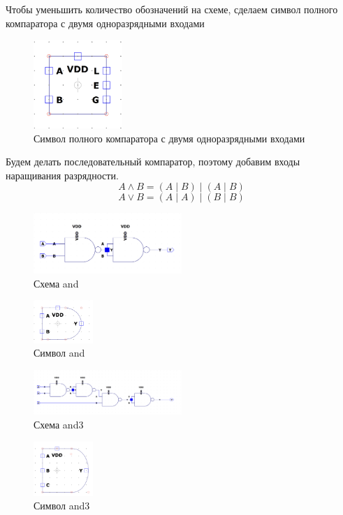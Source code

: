 \documentclass[12pt,onecolumn]{article}
\begin{document}
Чтобы уменьшить количество обозначений на схеме, сделаем символ полного компаратора с двумя одноразрядными входами
\begin{figure}[H]
    \centering
    \includegraphics[width=0.3\textwidth]{image/full-comparator1-sym.png}
    \caption{Символ полного компаратора с двумя одноразрядными входами}
\end{figure}
Будем делать последовательный компаратор, поэтому добавим входы наращивания разрядности.
$$A\wedge B = (A \mid B) \mid (A \mid B)$$
$$A \vee B = (A \mid A) \mid (B \mid B)$$
\begin{figure}[H]
    \centering
    \includegraphics[width=0.5\textwidth]{image/and.png}
    \caption{Схема and}
\end{figure}
\begin{figure}[H]
    \centering
    \includegraphics[width=0.2\textwidth]{image/and-sym.png}
    \caption{Символ and}
\end{figure}
\begin{figure}[H]
    \centering
    \includegraphics[width=0.5\textwidth]{image/and3.png}
    \caption{Схема and3}
\end{figure}
\begin{figure}[H]
    \centering
    \includegraphics[width=0.2\textwidth]{image/and3-sym.png}
    \caption{Символ and3}
\end{figure}
\end{document}
